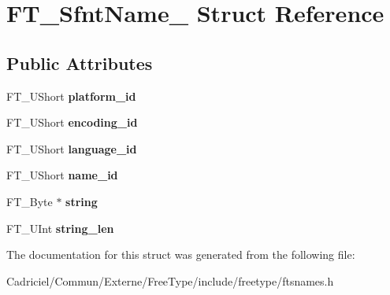 \hypertarget{struct_f_t___sfnt_name__}{\section{F\-T\-\_\-\-Sfnt\-Name\-\_\- Struct Reference}
\label{struct_f_t___sfnt_name__}
}
\subsection*{Public Attributes}
\begin{DoxyCompactItemize}
\item 
\hypertarget{struct_f_t___sfnt_name___ae92450a058eb4737df85f66226d69f43}{F\-T\-\_\-\-U\-Short {\bfseries platform\-\_\-id}}\label{struct_f_t___sfnt_name___ae92450a058eb4737df85f66226d69f43}

\item 
\hypertarget{struct_f_t___sfnt_name___a01f4573605eab3f4d2e4b9b50b0de98f}{F\-T\-\_\-\-U\-Short {\bfseries encoding\-\_\-id}}\label{struct_f_t___sfnt_name___a01f4573605eab3f4d2e4b9b50b0de98f}

\item 
\hypertarget{struct_f_t___sfnt_name___a6fb23e0f299a97b25b63805b04cf1fc5}{F\-T\-\_\-\-U\-Short {\bfseries language\-\_\-id}}\label{struct_f_t___sfnt_name___a6fb23e0f299a97b25b63805b04cf1fc5}

\item 
\hypertarget{struct_f_t___sfnt_name___ac07be3e852408990fe0a910f00b68f4e}{F\-T\-\_\-\-U\-Short {\bfseries name\-\_\-id}}\label{struct_f_t___sfnt_name___ac07be3e852408990fe0a910f00b68f4e}

\item 
\hypertarget{struct_f_t___sfnt_name___ab369e2c3d8dc9662f69c53e4d3158067}{F\-T\-\_\-\-Byte $\ast$ {\bfseries string}}\label{struct_f_t___sfnt_name___ab369e2c3d8dc9662f69c53e4d3158067}

\item 
\hypertarget{struct_f_t___sfnt_name___a4ebdb7207b5681d16f9cc17f432cb56f}{F\-T\-\_\-\-U\-Int {\bfseries string\-\_\-len}}\label{struct_f_t___sfnt_name___a4ebdb7207b5681d16f9cc17f432cb56f}

\end{DoxyCompactItemize}


The documentation for this struct was generated from the following file\-:\begin{DoxyCompactItemize}
\item 
Cadriciel/\-Commun/\-Externe/\-Free\-Type/include/freetype/ftsnames.\-h\end{DoxyCompactItemize}
